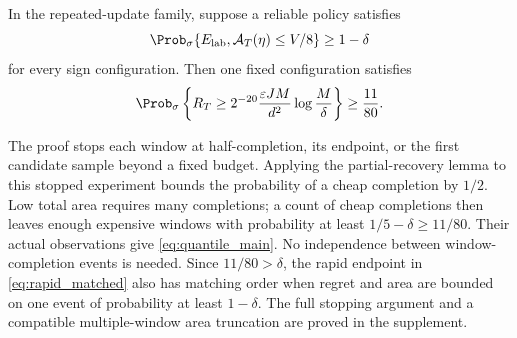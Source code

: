 \begin{theorem}
\label{thm:quantile_main}
In the repeated-update family, suppose a reliable policy satisfies
\[
 \Prob_\sigma\{E_{\rm lab},\mathcal A_T(\eta)\le V/8\}\ge1-\delta
\]
for every sign configuration. Then one fixed configuration satisfies
\begin{equation}
 \Prob_\sigma\left\{R_T\ge
 2^{-20}\frac{\varepsilon JM}{d^2}\log\frac M\delta\right\}
 \ge\frac{11}{80}.
 \label{eq:quantile_main}
\end{equation}
\end{theorem}

The proof stops each window at half-completion, its endpoint, or the first
candidate sample beyond a fixed budget. Applying the partial-recovery lemma
to this stopped experiment bounds the probability of a cheap completion by
$1/2$. Low total area requires many completions; a count of cheap completions
then leaves enough expensive windows with probability at least
$1/5-\delta\ge11/80$. Their actual observations give
\eqref{eq:quantile_main}. No independence between window-completion events is
needed. Since $11/80>\delta$, the rapid endpoint in
\eqref{eq:rapid_matched} also has matching order when regret and area are
bounded on one event of probability at least $1-\delta$. The full stopping
argument and a compatible multiple-window area truncation are proved in the
supplement.

